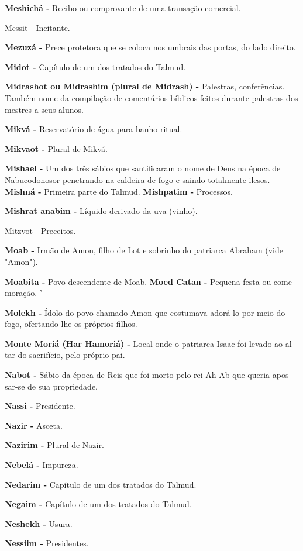 \textbf{Meshichá -} Recibo ou comprovante de uma transação comercial.

Messit - Incitante.

\textbf{Mezuzá -} Prece protetora que se co­loca nos umbrais das portas,
do lado direito.

\textbf{Midot -} Capítulo de um dos tratados do Talmud.

\textbf{Midrashot ou Midrashim (plural de Midrash) -} Palestras,
conferências. Também nome da compilação de co­mentários bíblicos feitos
durante pales­tras dos mestres a seus alunos.

\textbf{Mikvá -} Reservatório de água para ba­nho ritual.

\textbf{Mikvaot -} Plural de Mikvá.

\textbf{Mishael -} Um dos três sábios que san­tificaram o nome de Deus
na época de Nabucodonosor penetrando na caldei­ra de fogo e saindo
totalmente ilesos. \textbf{Mishná -} Primeira parte do Talmud.
\textbf{Mishpatim -} Processos.

\textbf{Mishrat anabim -} Líquido derivado da uva (vinho).

Mitzvot - Preceitos.

\textbf{Moab -} Irmão de Amon, filho de Lot e sobrinho do patriarca
Abraham (vi­de "Amon").

\textbf{Moabita -} Povo descendente de Moab. \textbf{Moed Catan -}
Pequena festa ou come­moração. '

\textbf{Molekh -} Ídolo do povo chamado Amon que costumava adorá-lo por
meio do fogo, ofertando-lhe os pró­prios filhos.

\textbf{Monte Moriá (Har Hamoriá) -} Local onde o patriarca Isaac foi
levado ao al­tar do sacrifício, pelo próprio pai.

\textbf{Nabot -} Sábio da época de Reis que foi morto pelo rei Ah-Ab que
queria apos­sar-se de sua propriedade.

\textbf{Nassi -} Presidente.

\textbf{Nazir -} Asceta.

\textbf{Nazirim -} Plural de Nazir.

\textbf{Nebelá -} Impureza.

\textbf{Nedarim -} Capítulo de um dos trata­dos do Talmud.

\textbf{Negaim -} Capítulo de um dos tratados do Talmud.

\textbf{Neshekh -} Usura.

\textbf{Nessiim -} Presidentes.

